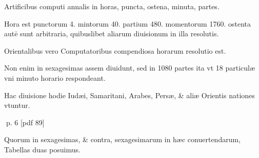 \begin{parnumbers}
Artificibus computi annalis in horas, puncta, ostena, minuta, partes.

Hora est punctorum 4. mintorum 40. partium 480. momentorum 1760. ostenta autē sunt arbitraria, quibuslibet aliarum diuisionum in illa resolutis.

 Orientalibus vero Computatoribus compendiosa horarum resolutio est.

Non enim in sexagesimas assem diuidunt, sed in 1080 partes ita vt 18 particulæ vni minuto horario respondeant.

Hac diuisione hodie Iudæi, Samaritani, Arabes, Persæ, \& aliæ Orientis nationes vtuntur.

\end{parnumbers}
\clearpage
p. 6 [pdf 89]

\begin{parnumbers}

 Quorum in sexagesimas, \& contra, sexagesimarum in hæc conuertendarum, Tabellas duas posuimus.

\end{parnumbers}

